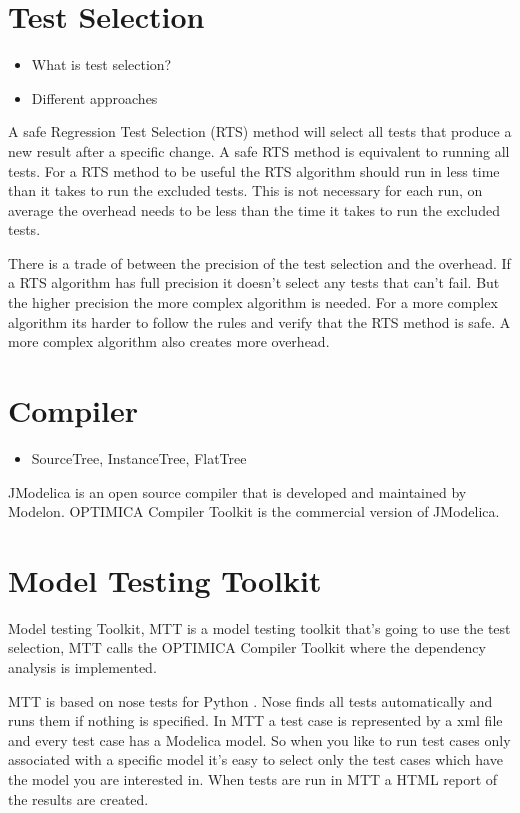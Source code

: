 \documentclass{cslthse-msc}
\begin{document}
\section{Test Selection}
\begin{itemize}
	\item What is test selection?
	\item Different approaches
\end{itemize}
A safe Regression Test Selection (RTS) method will select all tests that produce a new result after a specific change. A safe RTS method is equivalent to running all tests. For a RTS method to be useful the RTS algorithm should run in less time than it takes to run the excluded tests. This is not necessary for each run, on average the overhead needs to be less than the time it takes to run the excluded tests.

There is a trade of between the precision of the test selection and the overhead. If a RTS algorithm has full precision it doesn't select any tests that can't fail. But the higher precision the more complex algorithm is needed. For a more complex algorithm its harder to follow the rules and verify that the RTS method is safe. A more complex algorithm also creates more overhead.

\section{Compiler}
\begin{itemize}
	\item SourceTree, InstanceTree, FlatTree
\end{itemize}
JModelica is an open source compiler that is developed and maintained by Modelon. OPTIMICA Compiler Toolkit is the commercial version of JModelica.

\section{Model Testing Toolkit}
Model testing Toolkit, MTT is a model testing toolkit that's going to use the test selection, MTT calls the OPTIMICA Compiler Toolkit where the dependency analysis is implemented.

MTT is based on nose tests for Python \cite{noseDoc}. Nose finds all tests automatically and runs them if nothing is specified. In MTT a test case is represented by a xml file and every test case has a Modelica model. So when you like to run test cases only associated with a specific model it's easy to select only the test cases which have the model you are interested in. When tests are run in MTT a HTML report of the results are created.
\end{document}
